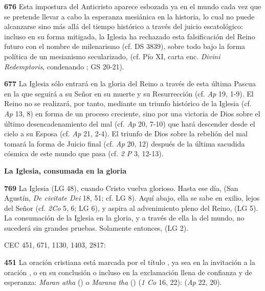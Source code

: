 \begin{body}
\textbf{676} Esta impostura del Anticristo aparece esbozada ya en el mundo cada vez que se pretende llevar a cabo la esperanza mesiánica en la historia, lo cual no puede alcanzarse sino más allá del tiempo histórico a través del juicio escatológico: incluso en su forma mitigada, la Iglesia ha rechazado esta falsificación del Reino futuro con el nombre de milenarismo (cf. DS 3839), sobre todo bajo la forma política de un mesianismo secularizado,  (cf. Pío XI, carta enc. \emph{Divini Redemptoris}, condenando ; GS 20-21).

\textbf{677} La Iglesia sólo entrará en la gloria del Reino a través de esta última Pascua en la que seguirá a su Señor en su muerte y su Resurrección (cf. \emph{Ap} 19, 1-9). El Reino no se realizará, por tanto, mediante un triunfo histórico de la Iglesia (cf. \emph{Ap} 13, 8) en forma de un proceso creciente, sino por una victoria de Dios sobre el último desencadenamiento del mal (cf. \emph{Ap} 20, 7-10) que hará descender desde el cielo a su Esposa (cf. \emph{Ap} 21, 2-4). El triunfo de Dios sobre la rebelión del mal tomará la forma de Juicio final (cf. \emph{Ap} 20, 12) después de la última sacudida cósmica de este mundo que pasa (cf. \emph{2 P} 3, 12-13).

\textbf{La Iglesia, consumada en la gloria}

\textbf{769} La Iglesia  (LG 48), cuando Cristo vuelva glorioso. Hasta ese día,  (San Agustín, \emph{De civitate Dei} 18, 51; cf. LG 8). Aquí abajo, ella se sabe en exilio, lejos del Señor (cf. \emph{2Co} 5, 6; LG 6), y aspira al advenimiento pleno del Reino,  (LG 5). La consumación de la Iglesia en la gloria, y a través de ella la del mundo, no sucederá sin grandes pruebas. Solamente entonces,  (LG 2).


CEC 451, 671, 1130, 1403, 2817:

\textbf{451} La oración cristiana está marcada por el título , ya sea en la invitación a la oración , o en su conclusión  o incluso en la exclamación llena de confianza y de esperanza: \emph{Maran atha} () o \emph{Marana tha} () (\emph{1 Co} 16, 22):  (\emph{Ap} 22, 20).




\end{body}
